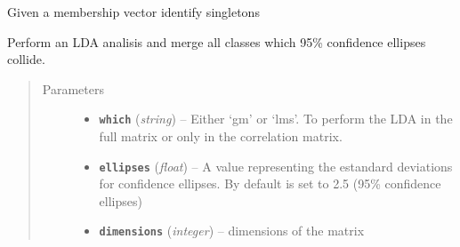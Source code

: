 \documentclass[letterpaper,10pt,english]{sphinxmanual}
\begin{document}
\begin{fulllineitems}
\begin{fulllineitems}
\begin{quote}
\begin{description}
\begin{itemize}
\end{itemize}

\end{description}\end{quote}

\end{fulllineitems}


\begin{fulllineitems}
\label{Doc:Moduler.GMgraph.Identify_Singletons}
Given a membership vector identify singletons

\end{fulllineitems}


\begin{fulllineitems}
\label{Doc:Moduler.GMgraph.LDAmerge}
Perform an LDA analisis and merge all classes which 95\% confidence ellipses collide.
\begin{quote}\begin{description}
\item[{Parameters}] \leavevmode\begin{itemize}
\item {} 
\textbf{\texttt{which}} (\emph{string}) -- Either `gm' or `lms'. To perform the LDA in the full matrix or only in the correlation matrix.

\item {} 
\textbf{\texttt{ellipses}} (\emph{float}) -- A value representing the estandard deviations for confidence ellipses. By default is set to 2.5 (95\% confidence ellipses)

\item {} 
\textbf{\texttt{dimensions}} (\emph{integer}) -- dimensions of the matrix

\end{itemize}

\end{description}\end{quote}

\end{fulllineitems}


\end{fulllineitems}

\end{document}
